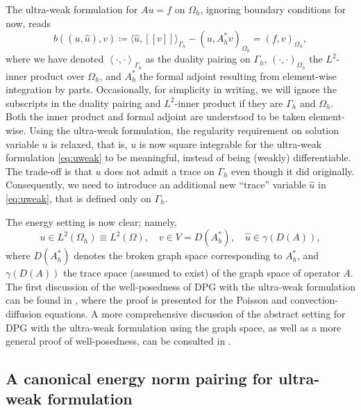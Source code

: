 \documentclass[11pt,onecolumn]{scrartcl}
\newcommand{\eqnlab}[1]{\label{eq:#1}}
\newcommand{\eqnref}[1]{\eqref{eq:#1}}
\newcommand{\LRp}[1]{\left( #1 \right)}
\newcommand{\LRs}[1]{\left[ #1 \right]}
\newcommand{\LRa}[1]{\left\langle #1 \right\rangle}
\newcommand{\jump}[1] {\ensuremath{\LRs{\![#1]\!}}}
\newcommand{\Gh}{\Gamma_h}
\newcommand{\Oh}{\Omega_h}
\begin{document}
The ultra-weak formulation for $Au = f$ on $\Oh$, ignoring boundary
conditions for now, reads
\begin{equation}
\eqnlab{uweak}
b\left(\left(u, \widehat{u}\right),v\right) \coloneqq \langle \widehat{u}, \jump{v}
\rangle_{\Gh} - (u,A_h^*v)_{\Oh}= \LRp{f,v}_{\Oh},
\end{equation}
where we have denoted $\LRa{\cdot,\cdot}_{\Gh}$ as the duality
pairing on $\Gh$, $\LRp{\cdot,\cdot}_{\Oh}$ the $L^2$-inner
product over $\Oh$, and $A_h^*$ the formal adjoint resulting from
element-wise integration by parts.  Occasionally, for simplicity in
writing, we will ignore the subscripts in the duality pairing and
$L^2$-inner product if they are $\Gh$ and $\Oh$. Both the
inner product and formal adjoint are understood to be taken
element-wise. Using the ultra-weak formulation, the regularity
requirement on solution variable $u$ is relaxed, that is, $u$ is now
square integrable for the ultra-weak formulation \eqnref{uweak} to be
meaningful, instead of being (weakly) differentiable.  The trade-off
is that $u$ does not admit a trace on $\Gh$ even though it did
originally. Consequently, we need to introduce an additional new
``trace'' variable $\widehat{u}$ in \eqnref{uweak}, that is defined only on
$\Gh$.

The energy setting is now clear; namely,
\[
u\in L^2\LRp{\Oh} \equiv L^2(\Omega), \quad v\in V=D(A^*_h), \quad
\widehat{u}\in \gamma(D(A)),
\]
where $D(A_h^*)$ denotes the broken graph space corresponding to $A_h^*$,
and $\gamma(D(A))$ the trace space (assumed to exist) of the graph space of
operator $A$. The first discussion of the well-posedness of DPG with the ultra-weak formulation can be found in \cite{analysisDPG}, where the proof is presented for the Poisson and convection-diffusion equations. A more comprehensive discussion of the abstract setting for DPG with the ultra-weak formulation using the graph space, as well as a more general proof of well-posedness, can be consulted in \cite{Bui-ThanhDemkowiczGhattas11b}. 

\subsection{A canonical energy norm pairing for ultra-weak formulation}
\end{document}
